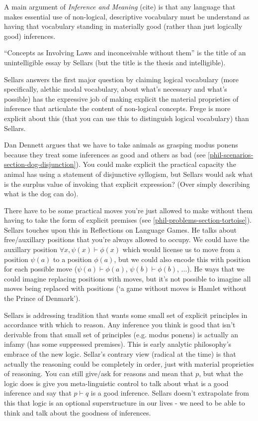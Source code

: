A main argument of \textit{Inference and Meaning} (cite) is that any language that makes essential use of non-logical, descriptive vocabulary must be understand as having that vocabulary standing in materially good (rather than just logically good) inferences.

``Concepts as Involving Laws and inconceivable without them'' is the title of an unintelligible essay by Sellars (but the title is the thesis and intelligible).

Sellars answers the first major question by claiming logical vocabulary (more specifically, alethic modal vocabulary, about what's necessary and what's possible) has the expressive job of making explicit the material proprieties of inference that articulate the content of non-logical concepts. Frege is more explicit about this (that you can use this to distinguish logical vocabulary) than Sellars.

Dan Dennett argues that we have to take animals as grasping modus ponens because they treat some inferences as good and others as bad (see \ref{phil-scenarios-section-dog-disjunction}). You could make explicit the practical capacity the animal has using a statement of disjunctive syllogism, but Sellars would ask what is the surplus value of invoking that explicit expression? (Over simply describing what is the dog can do).

There have to be some practical moves you're just allowed to make without them having to take the form of explicit premises (see \ref{phil-problems-section-tortoise}). Sellars touches upon this in Reflections on Language Games. He talks about free/auxillary positions that you're always allowed to occupy. We could have the auxillary position $\forall x, \psi(x)\vdash \phi(x)$ which would license us to move from a position $\psi(a)$ to a position $\phi(a)$, but we could also encode this with position for each possible move ($\psi(a)\vdash \phi(a)$, $\psi(b)\vdash\phi(b)$, ...). He ways that we could imagine replacing positions with moves, but it's not possible to imagine all moves being replaced with positions (`a game without moves is Hamlet without the Prince of Denmark').

Sellars is addressing tradition that wants some small set of explicit principles in accordance with which to reason. Any inference you think is good that isn't derivable from that small set of principles (e.g. modus ponens) is actually an infamy (has some suppressed premises). This is early analytic philosophy's embrace of the new logic. Sellar's contrary view (radical at the time) is that actually the reasoning could be completely in order, just with material proprieties of reasoning. You can still give/ask for reasons and mean that $p$, but what the logic does is give you meta-linguistic control to talk about what is a good inference and say that $p \vdash q$ is a good inference. Sellars doesn't extrapolate from this that logic is an optional superstructure in our lives - we need to be able to think and talk about the goodness of inferences.

